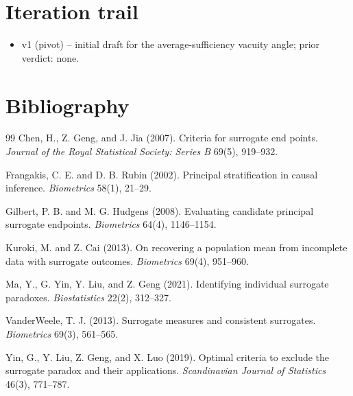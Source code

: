 \documentclass[11pt]{article}
\theoremstyle{definition}
\theoremstyle{plain}
\theoremstyle{remark}
\begin{document}
\section{Iteration trail}
\begin{itemize}[leftmargin=*]
\item v1 (pivot) -- initial draft for the average-sufficiency vacuity angle; prior verdict: none.
\end{itemize}

\section*{Bibliography}
\begin{thebibliography}{99}
Chen, H., Z. Geng, and J. Jia (2007). Criteria for surrogate end points. \emph{Journal of the Royal Statistical Society: Series B} 69(5), 919--932.

Frangakis, C. E. and D. B. Rubin (2002). Principal stratification in causal inference. \emph{Biometrics} 58(1), 21--29.

Gilbert, P. B. and M. G. Hudgens (2008). Evaluating candidate principal surrogate endpoints. \emph{Biometrics} 64(4), 1146--1154.

Kuroki, M. and Z. Cai (2013). On recovering a population mean from incomplete data with surrogate outcomes. \emph{Biometrics} 69(4), 951--960.

Ma, Y., G. Yin, Y. Liu, and Z. Geng (2021). Identifying individual surrogate paradoxes. \emph{Biostatistics} 22(2), 312--327.

VanderWeele, T. J. (2013). Surrogate measures and consistent surrogates. \emph{Biometrics} 69(3), 561--565.

Yin, G., Y. Liu, Z. Geng, and X. Luo (2019). Optimal criteria to exclude the surrogate paradox and their applications. \emph{Scandinavian Journal of Statistics} 46(3), 771--787.
\end{thebibliography}
\end{document}
